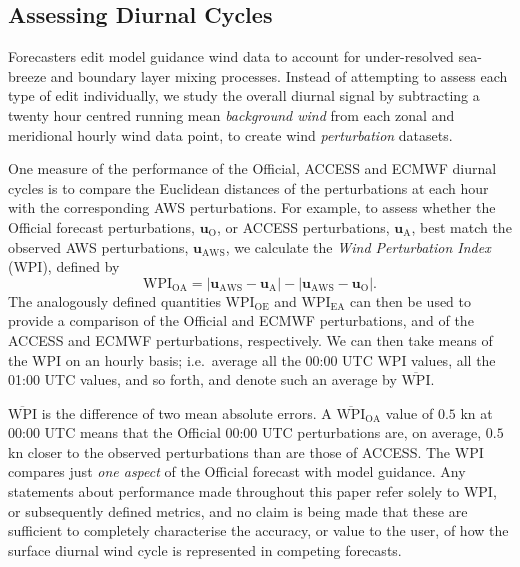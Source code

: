 \documentclass[twocol]{ametsoc}
\begin{document}
\subsection{Assessing Diurnal Cycles}
Forecasters edit model guidance wind data to account for under-resolved sea-breeze and boundary layer mixing processes. Instead of attempting to assess each type of edit individually, we study the overall diurnal signal by subtracting a twenty hour centred running mean \textit{background wind} from each zonal and meridional hourly wind data point, to create wind \emph{perturbation} datasets. 

One measure of the performance of the Official, ACCESS and ECMWF diurnal cycles is to compare the Euclidean distances of the perturbations at each hour with the corresponding AWS perturbations. For example, to assess whether the Official forecast perturbations, $\boldsymbol{u}_{\text{O}}$, or ACCESS perturbations, $\boldsymbol{u}_{\text{A}}$, best match the observed AWS perturbations, $\boldsymbol{u}_{\text{AWS}}$, we calculate the \textit{Wind Perturbation Index} (WPI), defined by 
\begin{equation}
\text{WPI}_\text{OA} = \left\lvert \boldsymbol{u}_{\text{AWS}}-\boldsymbol{u}_{\text{A}} \right\rvert - \left\lvert \boldsymbol{u}_{\text{AWS}}-\boldsymbol{u}_{\text{O}} \right\rvert. \label{Eq:WPI}
\end{equation} 
The analogously defined quantities $\text{WPI}_\text{OE}$ and $\text{WPI}_\text{EA}$ can then be used to provide a comparison of the Official and ECMWF perturbations, and of the ACCESS and ECMWF perturbations, respectively. We can then take means of the WPI on an hourly basis; i.e.~average all the 00:00 UTC WPI values,  all the 01:00 UTC values, and so forth, and denote such an average by $\overline{\text{WPI}}$. 

$\overline{\text{WPI}}$ is the difference of two mean absolute errors. A $\overline{\text{WPI}}_\text{OA}$ value of $0.5$ kn at 00:00 UTC means that the Official 00:00 UTC perturbations are, on average, $0.5$ kn closer to the observed perturbations than are those of ACCESS. The $\text{WPI}$ compares just \textit{one aspect} of the Official forecast with model guidance. Any statements about performance made throughout this paper refer solely to WPI, or subsequently defined metrics, and no claim is being made that these are sufficient to completely characterise the accuracy, or value to the user, of how the surface diurnal wind cycle is represented in competing forecasts.
\end{document}
